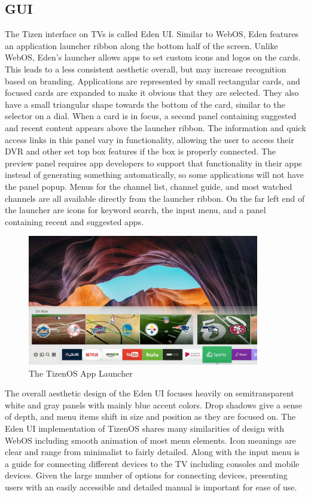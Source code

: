 \documentclass[12pt, letterpaper]{article}
\begin{document}
\subsection{GUI}
The Tizen interface on TVs is called Eden UI. Similar to WebOS, Eden features an application launcher ribbon along the bottom half of the screen. Unlike WebOS, Eden's launcher allows apps to set custom icons and logos on the cards. This leads to a less consistent aesthetic overall, but may increase recognition based on branding. Applications are represented by small rectangular cards, and focused cards are expanded to make it obvious that they are selected.  They also have a small triangular shape towards the 
bottom of the card, similar to the selector on a dial.  When a card is in focus, a second panel containing suggested and recent content appears above the launcher ribbon. The information and quick access links in this panel vary in functionality, allowing the user to access their DVR and other set top box features if the box is properly connected. The preview panel requires app developers to support that functionality in their apps instead of generating something automatically, so some applications will not have the panel popup.
Menus for the channel list, channel guide, and most watched channels are all available directly from the launcher ribbon. On the far left end of the launcher are icons for keyword search, the input menu, and a panel containing recent and suggested apps.
\begin{figure}[h]
    \includegraphics[width=0.9\textwidth]{samsung-tizen-2017-aaa-5a2c4d0e96f7d000373bfb76.jpg}
    \caption{The TizenOS App Launcher}
\end{figure}
\newpage
The overall aesthetic design of the Eden UI focuses heavily on semitransparent white and gray panels with mainly blue accent colors. Drop shadows give a sense of depth, and menu items shift in size and position as they are focused on. The Eden UI implementation of TizenOS shares many similarities of design with WebOS including smooth animation of most menu elements. Icon meanings are clear and range from minimalist to fairly detailed. Along with the input menu is a guide for connecting different devices to the TV including consoles and mobile devices.  
Given the large number of options for connecting devices, presenting users with an easily accessible and detailed manual is important for ease of use. 
\end{document}

